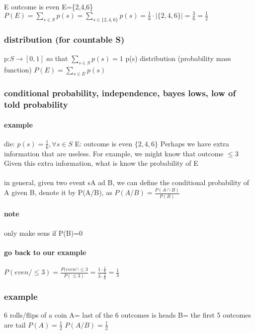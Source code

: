 \documentclass[a4paper,10pt]{article}
\begin{document}
\paragraph{}
E outcome is even
\newline
E=\{2,4,6\}
\newline
$P(E)=\sum_{s\in S}p(s)=\sum_{s\in \{2,4,6\}}p(s)=\frac{1}{6}\cdot|\{2,4,6\}|=\frac{3}{6}=\frac{1}{2}$
\subsubsection{distribution (for countable S)}
p:$S\to [0,1]$ so that $\sum_{s\in S}p(s)=1$
\newline
p(s) distribution (probability mass function)
\newline
$P(E)=\sum_{s\in E}p(s)$
\subsubsection{conditional probability, independence, bayes lows, low of told probability}
\paragraph{example}
die:
\newline
$p(s)=\frac{1}{6},\forall s\in S$
\newline
E: outcome is even $\{2,4,6\}$
\newline
Perhaps we have extra information that are useless. For example, we might know that outcome $\leq 3$
\newline
Given this extra information, what is know the probability of E
\paragraph{}
in general, given two event sA ad B, we can define the conditional probability of A given B, denote it by P(A/B), as
\newline
$P(A/B)=\frac{P(A\cap B)}{P(B)}$
\paragraph{note}
only make sens if P(B)=0
\paragraph{go back to our example}
$P(even/\leq 3)=\frac{P(even \cap \leq 3}{P(\leq 3)}=\frac{1\cdot \frac{1}{6}}{3\cdot \frac{1}{6}}=\frac{1}{3}$
\subsubsection{example}
6 rolls/flips of a coin
\newline
A= last of the 6 outcomes is heads
\newline
B= the first 5 outcomes are tail
\newline
$P(A)=\frac{1}{2}$
\newline
$P(A/B)=\frac{1}{2}$
\end{document}
